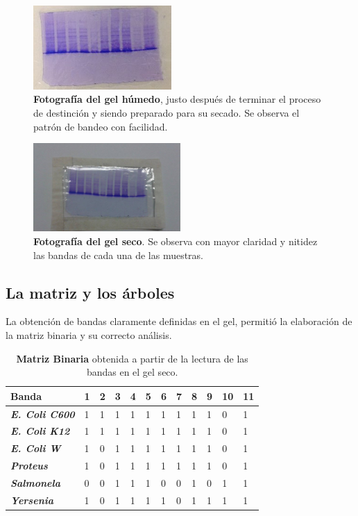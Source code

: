 \documentclass[%
 reprint,
 amsmath,amssymb,
 aps,
showkeys,
letter,
12pts
]{revtex4-1}
\begin{document}
		\begin{figure}
		\includegraphics[width=0.47\textwidth]{foto1.jpg}
		\caption{\textbf{Fotografía del gel húmedo}, justo después de terminar el proceso de destinción y siendo preparado para su secado. Se observa el patrón de bandeo con facilidad.}
		\label{Imagen:gelI}
		\end{figure} 
		
		\begin{figure}
		\includegraphics[width=0.5\textwidth]{gelseco.jpg}
		\caption{\textbf{Fotografía del gel seco}. Se observa con mayor claridad y nitidez las bandas de cada una de las muestras.}
		\label{Imagen:gelII}
		\end{figure} 
	
	\subsection{La matriz y los árboles}
		La obtención de bandas claramente definidas en el gel, permitió la elaboración de la matriz binaria y su correcto análisis.
		\begin{table}[h!]
			\centering
			\large
			\caption{\textbf{Matriz Binaria} obtenida a partir de la lectura de las bandas en el gel seco.}
			\label{tabla:Matriz}
			\begin{tabular}{|l||l|l|l|l|l|l|l|l|l|l|l|}
			\hline		
			\textbf{Banda} & \textbf{1} & \textbf{2} & \textbf{3} & \textbf{4} & \textbf{5} & \textbf{6} & \textbf{7} & \textbf{8} & \textbf{9} & \textbf{10} & \textbf{11}\\ \hline \hline
			\textbf{\textit{E. Coli C600}} & 1 & 1 & 1 & 1 & 1 & 1 & 1 & 1 & 1 & 0 & 1\\ \hline
			\textbf{\textit{E. Coli K12}}  & 1 & 1 & 1 & 1 & 1 & 1 & 1 & 1 & 1 & 0 & 1\\ \hline
			\textbf{\textit{E. Coli W}}    & 1 & 0 & 1 & 1 & 1 & 1 & 1 & 1 & 1 & 0 & 1\\ \hline
			\textbf{\textit{Proteus}}      & 1 & 0 & 1 & 1 & 1 & 1 & 1 & 1 & 1 & 0 & 1\\ \hline
			\textbf{\textit{Salmonela}}    & 0 & 0 & 1 & 1 & 1 & 0 & 0 & 1 & 0 & 1 & 1\\ \hline
			\textbf{\textit{Yersenia}}     & 1 & 0 & 1 & 1 & 1 & 1 & 0 & 1 & 1 & 1 & 1\\ \hline
			\end{tabular}
		\end{table}	
		
\end{document}
